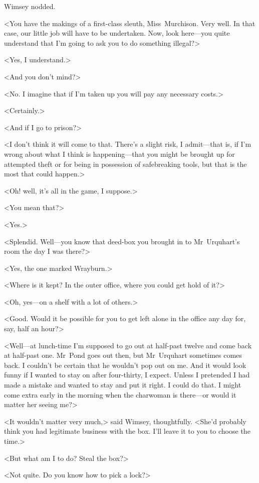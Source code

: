 Wimsey nodded.

<You have the makings of a first-class sleuth, Miss~Murchison. Very well. In that case, our little job will have to be undertaken. Now, look here—you quite understand that I'm going to ask you to do something illegal?>

<Yes, I understand.>

<And you don't mind?>

<No. I imagine that if I'm taken up you will pay any necessary costs.>

<Certainly.>

<And if I go to prison?>

<I don't think it will come to that. There's a slight risk, I admit—that is, if I'm wrong about what I think is happening—that you might be brought up for attempted theft or for being in possession of safebreaking tools, but that is the most that could happen.>

<Oh! well, it's all in the game, I suppose.>

<You mean that?>

<Yes.>

<Splendid. Well—you know that deed-box you brought in to Mr~Urquhart's room the day I was there?>

<Yes, the one marked Wrayburn.>

<Where is it kept? In the outer office, where you could get hold of it?>

<Oh, yes—on a shelf with a lot of others.>

<Good. Would it be possible for you to get left alone in the office any day for, say, half an hour?>

<Well—at lunch-time I'm supposed to go out at half-past twelve and come back at half-past one. Mr~Pond goes out then, but Mr~Urquhart sometimes comes back. I couldn't be certain that he wouldn't pop out on me. And it would look funny if I wanted to stay on after four-thirty, I expect. Unless I pretended I had made a mistake and wanted to stay and put it right. I could do that. I might come extra early in the morning when the charwoman is there—or would it matter her seeing me?>

<It wouldn't matter very much,> said Wimsey, thoughtfully. <She'd probably think you had legitimate business with the box. I'll leave it to you to choose the time.>

<But what am I to do? Steal the box?>

<Not quite. Do you know how to pick a lock?>

